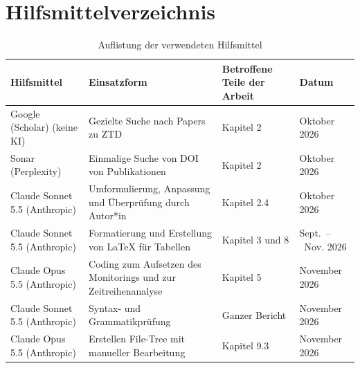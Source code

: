 \clearpage
\section{Hilfsmittelverzeichnis}
\label{sec:hilfsmittel}

\begin{table}[htpb]
    \centering
    \caption{Auflistung der verwendeten Hilfsmittel}
    \label{tab:hilfsmittelverzeichnis}
    \begin{tabularx}{\textwidth}{>{\raggedright\arraybackslash}X
                                 >{\raggedright\arraybackslash}X
                                 >{\raggedright\arraybackslash}X
                                 l}
        \toprule
        \textbf{Hilfsmittel} & \textbf{Einsatzform} & \textbf{Betroffene Teile der Arbeit} & \textbf{Datum} \\
        \midrule
        Google (Scholar) (keine KI) & Gezielte Suche nach Papers zu ZTD & Kapitel 2 & Oktober 2026 \\
        \rowcolor{lightgray}
        Sonar (Perplexity) & Einmalige Suche von DOI von Publikationen & Kapitel 2 & Oktober 2026 \\
        Claude Sonnet 5.5 (Anthropic) & Umformulierung, Anpassung und Überprüfung durch Autor*in & Kapitel 2.4 & Oktober 2026 \\
        \rowcolor{lightgray}
        Claude Sonnet 5.5 (Anthropic) & Formatierung und Erstellung von \LaTeX{} für Tabellen & Kapitel 3 und 8 & Sept.~--~Nov. 2026 \\
        Claude Opus 5.5 (Anthropic) & Coding zum Aufsetzen des Monitorings und zur Zeitreihenanalyse & Kapitel 5 & November 2026 \\
        \rowcolor{lightgray}
        Claude Sonnet 5.5 (Anthropic) & Syntax- und Grammatikprüfung & Ganzer Bericht & November 2026 \\
        Claude Opus 5.5 (Anthropic) & Erstellen File-Tree mit manueller Bearbeitung & Kapitel 9.3 & November 2026 \\
        \bottomrule
    \end{tabularx}
\end{table}
